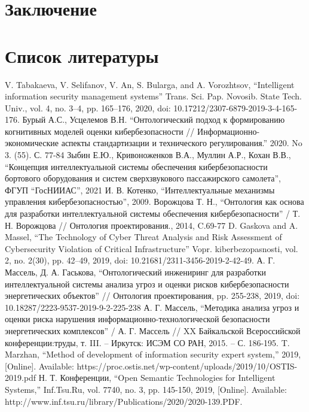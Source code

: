 
\newpage

\section{Заключение}
\newpage

\section{Список литературы}
\medskip

\begin{thebibliography}{}
V. Tabakaeva, V. Selifanov, V. An, S. Bularga, and A. Vorozhtsov,
``Intelligent information security management systems'' Trans. Sci. Pap. Novosib. State Tech. Univ., vol. 4,
no. 3–4, pp. 165–176, 2020, doi: 10.17212/2307-6879-2019-3-4-165-176.
Бурый А.С., Усцелемов В.Н. ``Онтологический подход к формированию когнитивных моделей оценки
кибербезопасности // Информационно-экономические аспекты стандартизации и технического
регулирования.'' 2020. No 3. (55). С. 77-84
Зыбин Е.Ю., Кривоноженков В.А., Муллин А.Р., Кохан В.В., ``Концепция
интеллектуальной системы обеспечения кибербезопасности бортового оборудования
и систем сверхзвукового пассажирского самолета'', ФГУП ``ГосНИИАС'', 2021
И. В. Котенко, ``Интеллектуальные механизмы управления кибербезопасностью'', 2009.
Ворожцова Т. Н., ``Онтология как основа для разработки интеллектуальной системы обеспечения
кибербезопасности'' / Т. Н. Ворожцова // Онтология проектирования., 2014, C.69-77
D. Gaskova and A. Massel, ``The Technology of Cyber Threat Analysis and Risk Assessment of Cybersecurity
Violation of Critical Infrastructure'' Vopr. kiberbezopasnosti, vol. 2, no. 2(30), pp. 42–49, 2019,
doi: 10.21681/2311-3456-2019-2-42-49.
А. Г. Массель, Д. А. Гаськова, ``Онтологический инжениринг для разработки интеллектуальной системы анализа угроз
и оценки рисков кибербезопасности энергетических объектов'' // Онтология проектирования, pp. 255-238, 2019,
doi: 10.18287/2223-9537-2019-9-2-225-238
А. Г. Массель, ``Методика анализа угроз и оценки риска нарушения информационно-технологической
безопасности энергетических комплексов'' / А. Г. Массель // XX Байкальской Всероссийской конференции:труды,
т. III. -- Иркутск: ИСЭМ СО РАН, 2015. -- С. 186-195.
\bibitem{}
T. Marzhan, ``Method of development of information security expert system,'' 2019, [Online].
Available: https://proc.ostis.net/wp-content/uploads/2019/10/OSTIS-2019.pdf
Н. Т. Конференции, “Open Semantic Technologies for Intelligent Systems,” Inf.Tsu.Ru, vol. 7740, no. 3, pp. 145-150, 2019,
[Online]. Available: http://www.inf.tsu.ru/library/Publications/2020/2020-139.PDF.
\end{thebibliography}


